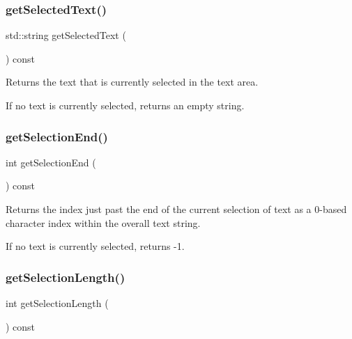 \subsubsection{\texorpdfstring{get\+Selected\+Text()}{getSelectedText()}}
{\footnotesize\ttfamily std\+::string get\+Selected\+Text (\begin{DoxyParamCaption}{ }\end{DoxyParamCaption}) const\hspace{0.3cm}{\ttfamily [virtual]}}



Returns the text that is currently selected in the text area. 

If no text is currently selected, returns an empty string. \mbox{\label{classsgl_1_1GTextArea_a2885313daa0e367cee2ccd0c704a6147}} 
\subsubsection{\texorpdfstring{get\+Selection\+End()}{getSelectionEnd()}}
{\footnotesize\ttfamily int get\+Selection\+End (\begin{DoxyParamCaption}{ }\end{DoxyParamCaption}) const\hspace{0.3cm}{\ttfamily [virtual]}}



Returns the index just past the end of the current selection of text as a 0-\/based character index within the overall text string. 

If no text is currently selected, returns -\/1. \mbox{\label{classsgl_1_1GTextArea_a68f7816694269b73e6284e756eb0c179}} 
\subsubsection{\texorpdfstring{get\+Selection\+Length()}{getSelectionLength()}}
{\footnotesize\ttfamily int get\+Selection\+Length (\begin{DoxyParamCaption}{ }\end{DoxyParamCaption}) const\hspace{0.3cm}{\ttfamily [virtual]}}



